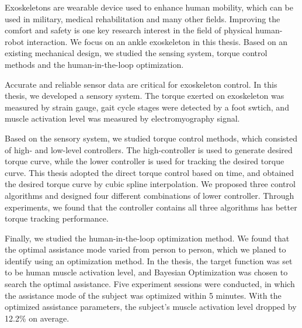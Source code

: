 \begin{abstractEn}
  Exoskeletons are wearable device used to enhance human mobility, which can be used in military, medical rehabilitation and many other fields. Improving the comfort and safety is one key research interest in the field of physical human-robot interaction. We focus on an ankle exoskeleton in this thesis. Based on an existing mechanical design, we studied the sensing system, torque control methods and the human-in-the-loop optimization.

  Accurate and reliable sensor data are critical for exoskeleton control. In this thesis, we developed a sensory system. The torque exerted on exoskeleton was measured by strain gauge, gait cycle stages were detected by a foot swtich, and muscle activation level was measured by electromyography signal.

  Based on the sensory system, we studied torque control methods, which consisted of high- and low-level controllers. The high-controller is used to generate desired torque curve, while the lower controller is used for tracking the desired torque curve. This thesis adopted the direct torque control based on time, and obtained the desired torque curve by cubic spline interpolation. We proposed three control algorithms and designed four different combinations of lower controller. Through experiments, we found that the controller contains all three algorithms has better torque tracking performance.

  Finally, we studied the human-in-the-loop optimization method. We found that the optimal assistance mode varied from person to person, which we planed to identify using an optimization method. In the thesis, the target function was set to be human muscle activation level, and Bayesian Optimization was chosen to search the optimal assistance. Five experiment sessions were conducted, in which the assistance mode of the subject was optimized within 5 minutes. With the optimized assistance parameters, the subject's muscle activation level dropped by 12.2\% on average.

\end{abstractEn}


\usepackage{subfig}
\usepackage{rotating}
\usepackage[usenames,dvipsnames]{xcolor}
\usepackage{tikz}
\usepackage{pgfplots}
\pgfplotsset{compat=1.16}
\usepackage{ifthen}
\usepackage{longtable}
\usepackage{siunitx}
\usepackage{listings}
\usepackage{multirow}
\usepackage[bottom]{footmisc}
\usepackage{pifont}

